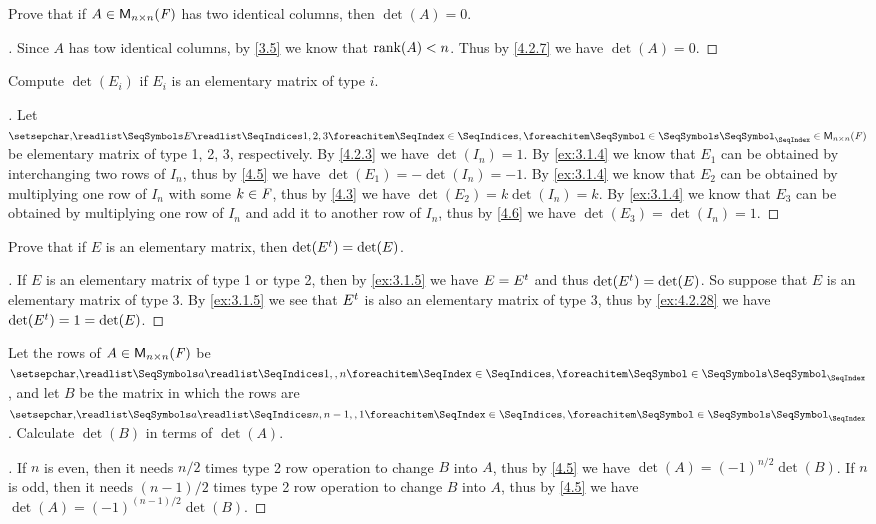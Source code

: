 \begin{ex}\label{ex:4.2.27}
	Prove that if \(A \in \ms[n][n][\F]\) has two identical columns, then \(\det(A) = 0\).
\end{ex}

\begin{proof}[]
	Since \(A\) has tow identical columns, by \cref{3.5} we know that \(\rk{A} < n\).
	Thus by \cref{4.2.7} we have \(\det(A) = 0\).
\end{proof}

\begin{ex}\label{ex:4.2.28}
	Compute \(\det(E_i)\) if \(E_i\) is an elementary matrix of type \(i\).
\end{ex}

\begin{proof}[]
	Let \(\seq{E}{1,2,3} \in \ms[n][n][\F]\) be elementary matrix of type 1, 2, 3, respectively.
	By \cref{4.2.3} we have \(\det(I_n) = 1\).
	By \cref{ex:3.1.4} we know that \(E_1\) can be obtained by interchanging two rows of \(I_n\), thus by \cref{4.5} we have \(\det(E_1) = -\det(I_n) = -1\).
	By \cref{ex:3.1.4} we know that \(E_2\) can be obtained by multiplying one row of \(I_n\) with some \(k \in \mathit{F}\), thus by \cref{4.3} we have \(\det(E_2) = k \det(I_n) = k\).
	By \cref{ex:3.1.4} we know that \(E_3\) can be obtained by multiplying one row of \(I_n\) and add it to another row of \(I_n\), thus by \cref{4.6} we have \(\det(E_3) = \det(I_n) = 1\).
\end{proof}

\begin{ex}\label{ex:4.2.29}
	Prove that if \(E\) is an elementary matrix, then \(\det({E}^{t}) = \det(E)\).
\end{ex}

\begin{proof}[]
	If \(E\) is an elementary matrix of type 1 or type 2, then by \cref{ex:3.1.5} we have \(E = {E}^{t}\) and thus \(\det({E}^{t}) = \det(E)\).
	So suppose that \(E\) is an elementary matrix of type 3.
	By \cref{ex:3.1.5} we see that \({E}^{t}\) is also an elementary matrix of type 3, thus by \cref{ex:4.2.28} we have \(\det({E}^{t}) = 1 = \det(E)\).
\end{proof}

\begin{ex}\label{ex:4.2.30}
	Let the rows of \(A \in \ms[n][n][\F]\) be \(\seq{a}{1,,n}\), and let \(B\) be the matrix in which the rows are \(\seq{a}{n,n-1,,1}\).
	Calculate \(\det(B)\) in terms of \(\det(A)\).
\end{ex}

\begin{proof}[]
	If \(n\) is even, then it needs \(n / 2\) times type 2 row operation to change \(B\) into \(A\), thus by \cref{4.5} we have \(\det(A) = (-1)^{n / 2} \det(B)\).
	If \(n\) is odd, then it needs \((n - 1) / 2\) times type 2 row operation to change \(B\) into \(A\), thus by \cref{4.5} we have \(\det(A) = (-1)^{(n - 1) / 2} \det(B)\).
\end{proof}
